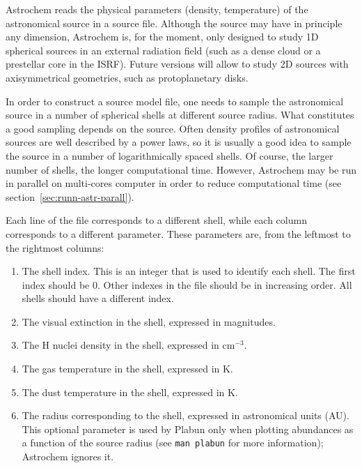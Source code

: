 \documentclass[a4paper,12pt]{article}
\begin{document}
Astrochem reads the physical parameters (density, temperature) of the
astronomical source in a source file. Although the source may have in
principle any dimension, Astrochem is, for the moment, only designed
to study 1D spherical sources in an external radiation field (such as
a dense cloud or a prestellar core in the ISRF). Future versions will
allow to study 2D sources with axisymmetrical geometries, such as
protoplanetary disks.

In order to construct a source model file, one needs to sample the
astronomical source in a number of spherical shells at different
source radius. What constitutes a good sampling depends on the
source. Often density profiles of astronomical sources are well
described by a power laws, so it is usually a good idea to sample the
source in a number of logarithmically spaced shells. Of course, the
larger number of shells, the longer computational time. However,
Astrochem may be run in parallel on multi-cores computer in order to
reduce computational time (see section~\ref{sec:runn-astr-parall}).

Each line of the file corresponds to a different shell, while each
column corresponds to a different parameter. These parameters are,
from the leftmost to the rightmost columns:

\begin{enumerate}

\item The shell index. This is an integer that is used to identify
  each shell. The first index should be 0. Other indexes in the file
  should be in increasing order. All shells should have a different
  index.

\item The visual extinction in the shell, expressed in magnitudes.

\item The H nuclei density in the shell, expressed in cm$^{-3}$.

\item The gas temperature in the shell, expressed in K.

\item The dust temperature in the shell, expressed in K.

\item The radius corresponding to the shell, expressed in astronomical
  units (AU). This optional parameter is used by Plabun only when
  plotting abundances as a function of the source radius (see
  \verb=man plabun= for more information); Astrochem ignores it.

\end{enumerate}
\end{document}
